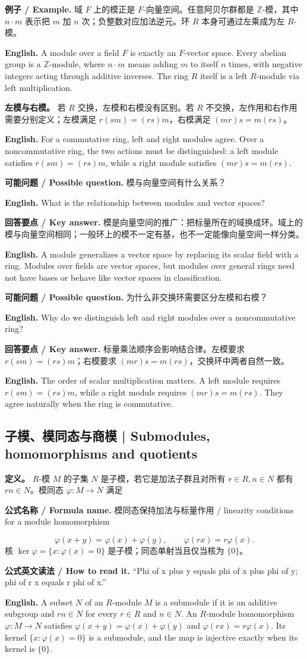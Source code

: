 \documentclass[UTF8,11pt,a4paper]{ctexart}
\newcommand{\EN}[1]{\par\noindent\textbf{English.} #1\par}
\newcommand{\READ}[1]{\par\noindent\textbf{公式英文读法 / How to read it.} #1\par}
\newcommand{\FORMULA}[2]{\par\noindent\textbf{公式名称 / Formula name.} #1 / #2\par}
\newcommand{\EX}[2]{\par\noindent\textbf{例子 / Example.} #1\par\EN{#2}}
\newcommand{\ASK}[4]{\par\noindent\textbf{可能问题 / Possible question.} #1\par\EN{#2}\noindent\textbf{回答要点 / Key answer.} #3\par\EN{#4}\medskip}
\begin{document}
\EX{域 $F$ 上的模正是 $F$-向量空间。任意阿贝尔群都是 $\mathbb Z$-模，其中 $n\cdot m$ 表示把 $m$ 加 $n$ 次；负整数对应加法逆元。环 $R$ 本身可通过左乘成为左 $R$-模。}{A module over a field $F$ is exactly an $F$-vector space. Every abelian group is a $\mathbb Z$-module, where $n\cdot m$ means adding $m$ to itself $n$ times, with negative integers acting through additive inverses. The ring $R$ itself is a left $R$-module via left multiplication.}

\noindent\textbf{左模与右模。} 若 $R$ 交换，左模和右模没有区别。若 $R$ 不交换，左作用和右作用需要分别定义；左模满足 $r(sm)=(rs)m$，右模满足 $(mr)s=m(rs)$。

\EN{For a commutative ring, left and right modules agree. Over a noncommutative ring, the two actions must be distinguished: a left module satisfies $r(sm)=(rs)m$, while a right module satisfies $(mr)s=m(rs)$.}

\ASK{模与向量空间有什么关系？}{What is the relationship between modules and vector spaces?}{模是向量空间的推广：把标量所在的域换成环。域上的模与向量空间相同；一般环上的模不一定有基，也不一定能像向量空间一样分类。}{A module generalizes a vector space by replacing its scalar field with a ring. Modules over fields are vector spaces, but modules over general rings need not have bases or behave like vector spaces in classification.}

\ASK{为什么非交换环需要区分左模和右模？}{Why do we distinguish left and right modules over a noncommutative ring?}{标量乘法顺序会影响结合律。左模要求 $r(sm)=(rs)m$；右模要求 $(mr)s=m(rs)$，交换环中两者自然一致。}{The order of scalar multiplication matters. A left module requires $r(sm)=(rs)m$, while a right module requires $(mr)s=m(rs)$. They agree naturally when the ring is commutative.}

\subsection{子模、模同态与商模 | Submodules, homomorphisms and quotients}
\noindent\textbf{定义。} $R$-模 $M$ 的子集 $N$ 是子模，若它是加法子群且对所有 $r\in R,n\in N$ 都有 $rn\in N$。模同态 $\varphi:M\to N$ 满足
\FORMULA{模同态保持加法与标量作用}{linearity conditions for a module homomorphism}
\[
\varphi(x+y)=\varphi(x)+\varphi(y),\qquad \varphi(rx)=r\varphi(x).
\]
核 $\ker\varphi=\{x:\varphi(x)=0\}$ 是子模；同态单射当且仅当核为 $\{0\}$。
\READ{“Phi of x plus y equals phi of x plus phi of y; phi of r x equals r phi of x.”}
\EN{A subset $N$ of an $R$-module $M$ is a submodule if it is an additive subgroup and $rn\in N$ for every $r\in R$ and $n\in N$. An $R$-module homomorphism $\varphi:M\to N$ satisfies $\varphi(x+y)=\varphi(x)+\varphi(y)$ and $\varphi(rx)=r\varphi(x)$. Its kernel $\{x:\varphi(x)=0\}$ is a submodule, and the map is injective exactly when its kernel is $\{0\}$.}
\end{document}
